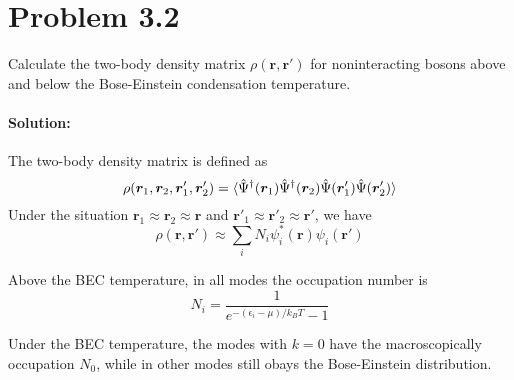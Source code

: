 \section*{Problem 3.2}
Calculate the two-body density matrix $\rho(\mathbf{r},\mathbf{r'})$ for noninteracting bosons above and below the Bose-Einstein condensation temperature.
\paragraph*{Solution:}
The two-body density matrix is defined as 
\begin{equation}
    \rho(\bm{r}_1, \bm{r}_2, \bm{r}'_1, \bm{r}'_2) = \braket{\hat{\Psi} ^{\dagger}(\bm{r}_1) \hat{\Psi }^{\dagger}(\bm{r}_2) \hat{\Psi}(\bm{r}'_1)\hat{\Psi}(\bm{r}'_2)}
\end{equation}
Under the situation $\bm{r}_1 \approx \bm{r}_2 \approx \bm{r}$ and $\bm{r}'_1 \approx \bm{r}'_2 \approx \bm{r}'$, we have
\begin{equation}
    \rho(\bm{r} , \bm{r}') \approx \sum_i N_i \psi ^*_i(\bm{r}) \psi_i(\bm{r}')
\end{equation}

Above the BEC temperature, in all modes the occupation number is 
\begin{equation}
    N_i = \frac{1}{e^{-(\epsilon _i - \mu)/k_BT}-1}
\end{equation}

Under the BEC temperature, the modes with $k=0$ have the macroscopically occupation $N_0$, while in other modes still obays the Bose-Einstein distribution.